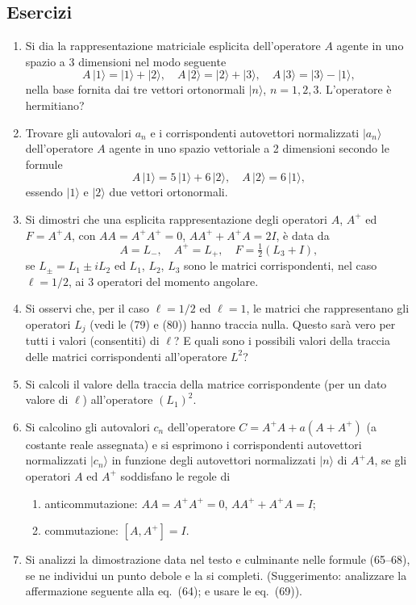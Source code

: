 \documentclass[11pt, a4paper]{book}
\numberwithin{equation}{section}
\newenvironment{esercizi}{\subsection*{Esercizi}\begin{enumerate}}{\end{enumerate}}
\begin{document}
\begin{esercizi}

\item Si dia la rappresentazione matriciale esplicita dell'operatore $A$
agente in uno spazio a 3 dimensioni nel modo seguente
\[
A\,|1\rangle = |1\rangle+|2\rangle, \quad
A\,|2\rangle = |2\rangle+|3\rangle, \quad
A\,|3\rangle = |3\rangle-|1\rangle,
\]
nella base fornita dai tre vettori ortonormali $|n\rangle$, $n=1,2,3$.
L'operatore è hermitiano?


\item Trovare gli autovalori $a_n$ e i corrispondenti autovettori
normalizzati $|a_n\rangle$ dell'operatore $A$ agente in uno spazio
vettoriale a 2 dimensioni secondo le formule
\[
A\,|1\rangle = 5\,|1\rangle + 6\,|2\rangle, \quad
A\,|2\rangle = 6\,|1\rangle,
\]
essendo $|1\rangle$ e $|2\rangle$ due vettori ortonormali.

\item Si dimostri che una esplicita rappresentazione degli operatori $A$,
$A^+$ ed $F = A^+A$, con $AA = A^+A^+ = 0$, $AA^+ + A^+A = 2I$, è data
da
\[
A = L_-, \quad A^+ = L_+, \quad F = \tfrac{1}{2}(L_3+I),
\]
se $L_\pm = L_1 \pm iL_2$ ed $L_1$, $L_2$, $L_3$ sono le matrici
corrispondenti, nel caso $\ell=1/2$, ai 3 operatori del momento angolare.

\item Si osservi che, per il caso $\ell=1/2$ ed $\ell=1$, le matrici che
rappresentano gli operatori $L_j$ (vedi le (79) e (80)) hanno traccia
nulla. Questo sarà vero per tutti i valori (consentiti) di $\ell$? E
quali sono i possibili valori della traccia delle matrici corrispondenti
all'operatore $L^2$?

\item Si calcoli il valore della traccia della matrice corrispondente
(per un dato valore di $\ell$) all'operatore $(L_1)^2$.

\item Si calcolino gli autovalori $c_n$ dell'operatore $C = A^+A +
a(A+A^+)$ (a costante reale assegnata) e si esprimono i corrispondenti
autovettori normalizzati $|c_n\rangle$ in funzione degli autovettori
normalizzati $|n\rangle$ di $A^+A$, se gli operatori $A$ ed $A^+$
soddisfano le regole di
\begin{enumerate}
  \item anticommutazione: $AA = A^+A^+ = 0$, $AA^+ + A^+A = I$;
  \item[*ii)] commutazione: $[A, A^+] = I$.
\end{enumerate}

\item Si analizzi la dimostrazione data nel testo e culminante nelle
formule (65--68), se ne individui un punto debole e la si completi.
(Suggerimento: analizzare la affermazione seguente alla eq.\ (64); e
usare le eq.\ (69)).

\end{esercizi}
\end{document}
